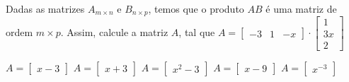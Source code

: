 Dadas as matrizes $A_{m\times n}$ e $B_{n\times p}$, temos que o produto $AB$ é uma matriz de ordem $m\times p$. Assim, calcule a matriz $A$, tal que $A = \left[ \begin{array}{ccc}
-3 & 1 & -x
\end{array} \right] \cdot \left[ \begin{array}{c}
1 \\ 3x \\ 2
\end{array} \right]$

$A=\left[ \begin{array}{c} x-3 \end{array} \right]$
$A=\left[ \begin{array}{c} x+3 \end{array} \right]$
$A=\left[ \begin{array}{c} x^2-3 \end{array} \right]$
$A=\left[ \begin{array}{c} x-9 \end{array} \right]$
$A=\left[ \begin{array}{c} x^{-3} \end{array} \right]$


